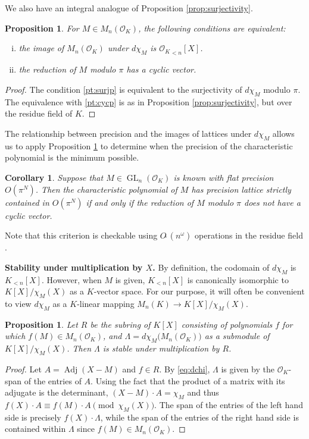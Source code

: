 \documentclass[sigconf]{acmart}
\DeclareMathOperator{\GL}{GL}
\DeclareMathOperator{\adj}{Adj}
\newcommand{\OK}{\mathcal{O}_K}
\newcommand{\softO}{O\tilde{~}}
\newtheorem{prop}[theo]{Proposition}
\newtheorem{cor}[theo]{Corollary}
\theoremstyle{definition}
\begin{document}
We also have an integral analogue of Proposition \ref{prop:surjectivity}.

\begin{prop}
\label{prop:intsurj}
For $M \in M_n(\OK)$, the following conditions are equivalent:
\begin{enumerate}[(i)]
\renewcommand{\itemsep}{0pt}
\item \label{pt:surjp} the image of $M_n(\OK)$ under $d\chi_M$ is 
${\OK}_{<n}[X]$.
\item \label{pt:cycp} the reduction of $M$ modulo $\pi$ has a cyclic vector.
\end{enumerate}
\end{prop}
\begin{proof}
The condition \eqref{pt:surjp} is equivalent to the surjectivity of $d\chi_M$ modulo $\pi$.  The equivalence with
\eqref{pt:cycp} is as in Proposition \ref{prop:surjectivity}, but over the residue field of $K$.
\end{proof}

The relationship between precision and the images of lattices under $d\chi_M$ allows us to
apply Proposition \ref{prop:intsurj} to determine when the precision of the characteristic polynomial
is the minimum possible.

\begin{cor} \label{cor:prec_gain}
Suppose that $M \in \GL_n(\OK)$ is known with flat precision $O(\pi^N)$.
Then the characteristic polynomial of $M$ has precision lattice strictly contained in $O(\pi^N)$
if and only if the reduction of $M$ modulo $\pi$ does not have a cyclic vector.
\end{cor}

Note that this criterion is checkable using $\softO(n^\omega)$ operations in the residue field \cite{storjohann:01a}.

\medskip

\noindent
{\bf Stability under multiplication by $X$.}
By definition, the codomain of $d \chi_M$ is $K_{< n}[X]$. 
However, when $M$ is given, $K_{< n}[X]$ is canonically isomorphic
to $K[X]/\chi_M(X)$ as a $K$-vector space. For our purpose, it will 
often be convenient to view $d \chi_M$ as a $K$-linear mapping
$M_n(K) \to K[X]/\chi_M(X)$.

\begin{prop}
Let $R$ be the subring of $K[X]$ consisting of polynomials $f$ for
which $f(M) \in M_n(\OK)$, and $\Lambda = d \chi_M \big(M_n(\OK)\big)$
as a submodule of $K[X]/\chi_M(X)$.  Then $\Lambda$ is stable under 
multiplication by $R$.
\end{prop}
\begin{proof}
Let $A = \adj(X{-}M)$ and $f \in R$.  By \eqref{eq:dchi}, $\Lambda$ is given by
the $\OK$-span of the entries of $A$.   Using the fact that the product of a matrix
with its adjugate is the determinant, $(X{-}M) \cdot A = \chi_M$ and thus
$f(X) \cdot A \equiv f(M) \cdot A \pmod{\chi_M(X)}$.  The span of the entries
of the left hand side is precisely $f(X) \cdot \Lambda$, while the span of the entries
of the right hand side is contained within $\Lambda$ since $f(M) \in M_n(\OK)$.
\end{proof}
\end{document}
